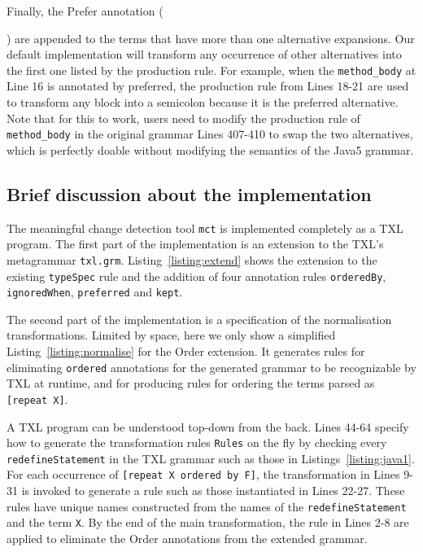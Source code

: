 \documentclass[10pt, conference, compsocconf]{IEEEtran}
\begin{document}
Finally, the Prefer annotation ({) are appended to the terms that have more than one alternative expansions.
Our default implementation will transform any occurrence of other alternatives into the first one listed by the production rule.
For example, when the {\tt method\_body} at Line 16 is annotated by preferred, the production rule from Lines 18-21 are used to transform any block into a semicolon because it is the preferred alternative. Note that for this to work, users need to modify
the production rule of {\tt method\_body} in the original grammar Lines 407-410 to swap the two alternatives, which is perfectly doable without modifying the semantics of the Java5 grammar.

\subsection{Brief discussion about the implementation}
The meaningful change detection tool {\tt mct} is implemented completely as a TXL program. The first part of the implementation is an extension to the TXL's metagrammar {\tt txl.grm}. Listing~\ref{listing:extend} shows the extension to the existing {\tt typeSpec} rule and the addition of four annotation rules {\tt orderedBy}, {\tt ignoredWhen}, {\tt preferred} and {\tt kept}.

 
The second part of the implementation is a specification of the normalisation transformations. Limited by space, here we only show a simplified Listing~\ref{listing:normalise} for the Order extension. It generates rules for eliminating {\tt ordered} annotations for the generated grammar to be recognizable by TXL at runtime, and for producing rules for ordering the
terms parsed as {\tt [repeat X]}. 

A TXL program can be understood top-down from the back. Lines 44-64 specify how to generate the transformation rules {\tt Rules} on the fly by checking every {\tt redefineStatement} in the TXL grammar such as those in Listings~\ref{listing:java1}.  For each occurrence of {\tt [repeat X ordered by F]}, the transformation in Lines 9-31 is invoked to generate a rule such as those instantiated in Lines 22-27. These rules have unique names constructed from the names of the {\tt redefineStatement} and the term {\tt X}. By the end of the main transformation, the rule in Lines 2-8 are applied to eliminate the Order annotations from the extended grammar.

}
\end{document}
